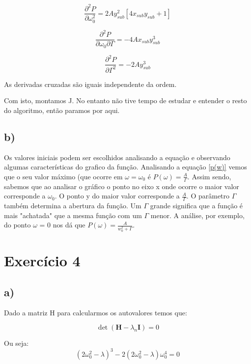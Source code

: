 \documentclass[a4wide]{report}
\begin{document}
\begin{equation*}
\frac{\partial^2 P}{\partial \omega_{0}^2} = 2Ay_{sub}^2 \left[ 4x_{sub}y_{sub} + 1 \right]
\end{equation*}


\begin{equation*}
\frac{\partial^2 P}{\partial \omega_{0} \partial \Gamma} = -4Ax_{sub}y_{sub}^3
\end{equation*}


\begin{equation*}
\frac{\partial^2 P}{\partial \Gamma^2} = -2Ay_{sub}^3
\end{equation*}


As derivadas cruzadas são iguais independente da ordem.


Com isto, montamos J. No entanto não tive tempo de estudar e entender o resto do algoritmo, então paramos por aqui.


\subsection*{b)}

Os valores iniciais podem ser escolhidos analisando a equação e observando algumas características do grafico da função. Analisando a equação \ref{p(w)} vemos que o seu valor máximo (que ocorre em $\omega = \omega_0$ é $P(\omega) = \frac{A}{\Gamma}$. Assim sendo, sabemos que ao analisar o gráfico o ponto no eixo x onde ocorre o maior valor corresponde a $\omega_0$. O ponto y do maior valor corresponde a $\frac{A}{\Gamma}$. O parâmetro $\Gamma$ também determina a abertura da função. Um $\Gamma$ grande significa que a função é mais "achatada" que a mesma função com um $\Gamma$ menor. A análise, por exemplo, do ponto $\omega$ = 0 nos dá que $P(\omega) = \frac{A}{w_0^2 + \Gamma}$.




\section*{Exercício 4}
\subsection*{a)}
Dado a matriz H para calcularmos os autovalores temos que:

\begin{equation*}
\det(\textbf{H} -\lambda_n \textbf{I}) = 0
\end{equation*}

Ou seja:
\begin{equation}
(2 \omega_0^2 - \lambda)^3 -2(2 \omega_0^2 - \lambda)\omega_0^4 = 0
\end{equation}
\end{document}
